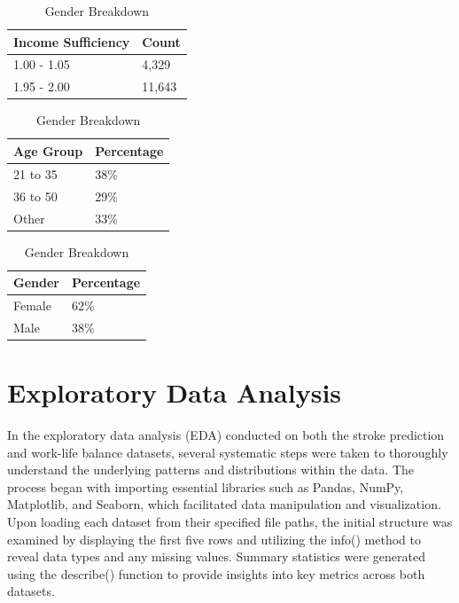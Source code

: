 \documentclass[runningheads]{llncs}
\begin{document}
\begin{enumerate}
\begin{table}[ht]
    \begin{minipage}{0.45\linewidth}
        \centering
        \caption{Income Sufficiency}\label{tab:income_sufficiency}
        \begin{tabular}{|l|l|}
            \hline
            \textbf{Income Sufficiency} & \textbf{Count} \\ 
            \hline
            1.00 - 1.05 & 4,329 \\ 
            1.95 - 2.00 & 11,643 \\ 
            \hline
        \end{tabular}
    \end{minipage}
    \hspace{0.05\linewidth} %
    \begin{minipage}{0.45\linewidth}
        \centering
        \caption{Demographic Breakdown}\label{tab:demographic_breakdown}
        \begin{tabular}{|l|l|}
            \hline
            \textbf{Age Group} & \textbf{Percentage} \\ 
            \hline
            21 to 35 & 38\% \\ 
            36 to 50 & 29\% \\ 
            Other & 33\% \\ 
            \hline
        \end{tabular}
    \end{minipage}
    \hspace{0.05\linewidth} %
    \begin{minipage}{0.45\linewidth}
        \centering
        \caption{Gender Breakdown}\label{tab:gender_breakdown}
        \begin{tabular}{|l|l|}
            \hline
            \textbf{Gender} & \textbf{Percentage} \\ 
            \hline
            Female & 62\% \\ 
            Male & 38\% \\ 
            \hline
        \end{tabular}
    \end{minipage}
\end{table}

\section{Exploratory Data Analysis}
In the exploratory data analysis (EDA) conducted on both the stroke prediction and work-life balance datasets, several systematic steps were taken to thoroughly understand the underlying patterns and distributions within the data. The process began with importing essential libraries such as Pandas, NumPy, Matplotlib, and Seaborn, which facilitated data manipulation and visualization. Upon loading each dataset from their specified file paths, the initial structure was examined by displaying the first five rows and utilizing the info() method to reveal data types and any missing values. Summary statistics were generated using the describe() function to provide insights into key metrics across both datasets.


\end{enumerate}
\end{document}
